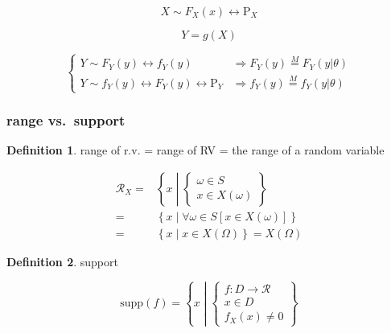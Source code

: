 \documentclass[
]{book}
\theoremstyle{definition}
\newtheorem{definition}{Definition}[chapter]
\theoremstyle{definition}
\theoremstyle{definition}
\theoremstyle{definition}
\theoremstyle{remark}
\begin{document}
\[
X\sim F_{{\scriptscriptstyle X}}\left(x\right)\leftrightarrow\mathrm{P}_{{\scriptscriptstyle X}}
\]

\[
Y=g\left(X\right)
\]

\[
\begin{cases}
Y\sim F_{{\scriptscriptstyle Y}}\left(y\right)\leftrightarrow f_{{\scriptscriptstyle Y}}\left(y\right) & \Rightarrow F_{{\scriptscriptstyle Y}}\left(y\right)\overset{M}{=}F_{{\scriptscriptstyle Y}}\left(y|\theta\right)\\
Y\sim f_{{\scriptscriptstyle Y}}\left(y\right)\leftrightarrow F_{{\scriptscriptstyle Y}}\left(y\right)\leftrightarrow\mathrm{P}_{{\scriptscriptstyle Y}} & \Rightarrow f_{{\scriptscriptstyle Y}}\left(y\right)\overset{M}{=}f_{{\scriptscriptstyle Y}}\left(y|\theta\right)
\end{cases}
\]

\hypertarget{range-vs.-support}{%
\subsubsection{range vs.~support}\label{range-vs.-support}}

\begin{definition}
\protect\hypertarget{def:unnamed-chunk-12}{}\label{def:unnamed-chunk-12}range of r.v. = range of RV = the range of a random variable
\end{definition}

\[
\begin{aligned}
\mathcal{R}_{{\scriptscriptstyle X}}=&\left\{ x\middle|\begin{cases}
\omega\in S\\
x\in X\left(\omega\right)
\end{cases}\right\} \\=&\left\{ x\middle|\forall\omega\in S\left[x\in X\left(\omega\right)\right]\right\} \\=&\left\{ x\middle|x\in X\left(\Omega\right)\right\} =X\left(\Omega\right)
\end{aligned}
\]

\begin{definition}
\protect\hypertarget{def:unnamed-chunk-13}{}\label{def:unnamed-chunk-13}support
\end{definition}

\[
\mathrm{supp}\left(f\right)=\left\{ x\middle|\begin{cases}
f:D\rightarrow\mathcal{R}\\
x\in D\\
f_{{\scriptscriptstyle X}}\left(x\right)\ne0
\end{cases}\right\} 
\]
\end{document}
